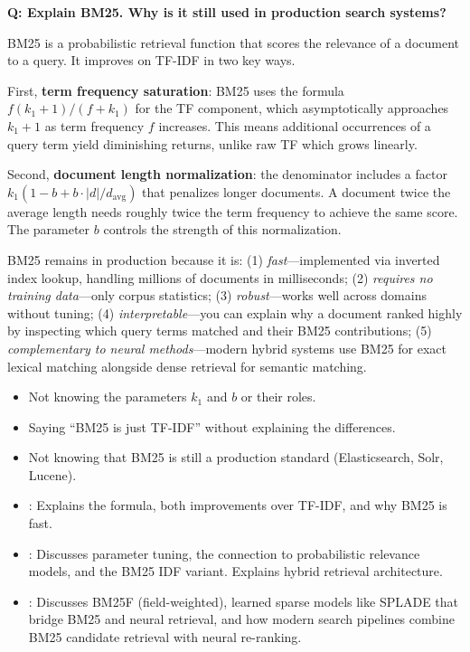 \begin{interviewq}
\textbf{Q: Explain BM25. Why is it still used in production search systems?}

 \quad {} \quad \badgefreq{\freqhigh}

\stronganswer
BM25 is a probabilistic retrieval function that scores the relevance of a document to a
query. It improves on TF-IDF in two key ways.

First, \textbf{term frequency saturation}: BM25 uses the formula $f(k_1+1)/(f+k_1)$ for
the TF component, which asymptotically approaches $k_1 + 1$ as term frequency $f$
increases. This means additional occurrences of a query term yield diminishing returns,
unlike raw TF which grows linearly.

Second, \textbf{document length normalization}: the denominator includes a factor
$k_1(1 - b + b \cdot |d|/d_{\text{avg}})$ that penalizes longer documents. A document
twice the average length needs roughly twice the term frequency to achieve the same score.
The parameter $b$ controls the strength of this normalization.

BM25 remains in production because it is: (1) \emph{fast}---implemented via inverted
index lookup, handling millions of documents in milliseconds; (2) \emph{requires no
training data}---only corpus statistics; (3) \emph{robust}---works well across domains
without tuning; (4) \emph{interpretable}---you can explain why a document ranked highly by
inspecting which query terms matched and their BM25 contributions; (5) \emph{complementary
to neural methods}---modern hybrid systems use BM25 for exact lexical matching alongside
dense retrieval for semantic matching.

\redflags
\begin{itemize}
    \item Not knowing the parameters $k_1$ and $b$ or their roles.
    \item Saying ``BM25 is just TF-IDF'' without explaining the differences.
    \item Not knowing that BM25 is still a production standard (Elasticsearch, Solr, Lucene).
\end{itemize}


\goodgreat
\begin{itemize}
    \item {}: Explains the formula, both improvements over TF-IDF, and why BM25
    is fast.
    \item {}: Discusses parameter tuning, the connection to probabilistic
    relevance models, and the BM25 IDF variant. Explains hybrid retrieval architecture.
    \item {}: Discusses BM25F (field-weighted), learned sparse models like
    SPLADE that bridge BM25 and neural retrieval, and how modern search pipelines combine
    BM25 candidate retrieval with neural re-ranking.
\end{itemize}


\end{interviewq}
